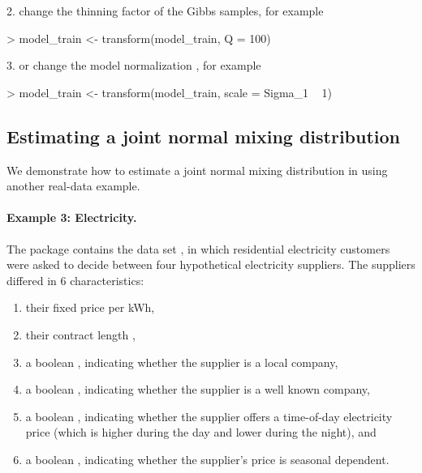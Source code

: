 \documentclass[article]{jss}
\begin{document}
2. change the thinning factor  of the Gibbs samples, for example
\begin{Schunk}
\begin{Sinput}
> model_train <- transform(model_train, Q = 100)
\end{Sinput}
\end{Schunk}

3. or change the model normalization , for example
\begin{Schunk}
\begin{Sinput}
> model_train <- transform(model_train, scale = Sigma_1 ~ 1)
\end{Sinput}
\end{Schunk}

\subsection{Estimating a joint normal mixing distribution} \label{subsec:normal_mix}

We demonstrate how to estimate a joint normal mixing distribution in  using another real-data example.

\paragraph{Example 3: Electricity.}

The  package \citep{Croissant:2020} contains the data set , in which residential electricity customers were asked to decide between four hypothetical electricity suppliers. The suppliers differed in 6 characteristics:
\begin{enumerate}
  \item their fixed price  per kWh,
  \item their contract length ,
  \item a boolean , indicating whether the supplier is a local company,
  \item a boolean , indicating whether the supplier is a well known company,
  \item a boolean , indicating whether the supplier offers a time-of-day electricity price (which is higher during the day and lower during the night), and
  \item a boolean , indicating whether the supplier's price is seasonal dependent.
\end{enumerate}
\end{document}
